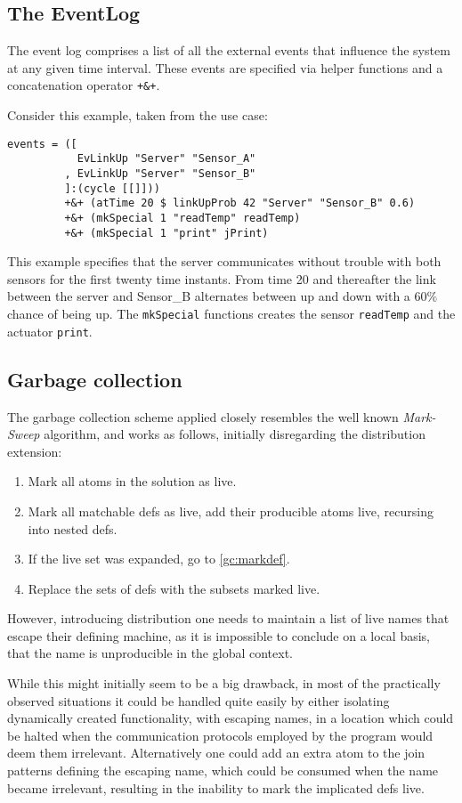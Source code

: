 \subsection{The EventLog}

The event log comprises a list of all the external events that influence the
system at any given time interval. These events are specified via helper
functions and a concatenation operator \texttt{+\&+}.

Consider this example, taken from the use case:
\begin{verbatim}
events = ([
           EvLinkUp "Server" "Sensor_A"
         , EvLinkUp "Server" "Sensor_B"
         ]:(cycle [[]]))
         +&+ (atTime 20 $ linkUpProb 42 "Server" "Sensor_B" 0.6)
         +&+ (mkSpecial 1 "readTemp" readTemp)
         +&+ (mkSpecial 1 "print" jPrint)
\end{verbatim}

This example specifies that the server communicates without trouble with both
sensors for the first twenty time instants. From time 20 and thereafter the link
between the server and Sensor\_B alternates between up and down with a $60\%$
chance of being up.
The \texttt{mkSpecial} functions creates the sensor \texttt{readTemp} and the
actuator \texttt{print}.

\subsection{Garbage collection}
The garbage collection scheme applied closely resembles the well known
\emph{Mark-Sweep} algorithm, and works as follows, initially disregarding the
distribution extension:
\begin{enumerate}
\item Mark all atoms in the solution as live.
\item Mark all matchable defs as live, add their producible atoms live,
recursing into nested defs.\label{gc:markdef}
\item If the live set was expanded, go to \ref{gc:markdef}.
\item Replace the sets of defs with the subsets marked live.
\end{enumerate}

However, introducing distribution one needs to maintain a list of live names that
escape their defining machine, as it is impossible to
conclude on a local basis, that the name is unproducible in the global context.

While this might initially seem to be a big drawback, in most of the practically
observed situations it could be handled quite easily by either isolating
dynamically created functionality, with escaping names, in a location which
could be halted when the communication protocols employed by the program would
deem them irrelevant.  Alternatively one could add an extra atom to the join
patterns defining the escaping name, which could be consumed when the name
became irrelevant, resulting in the inability to mark the implicated defs live.

